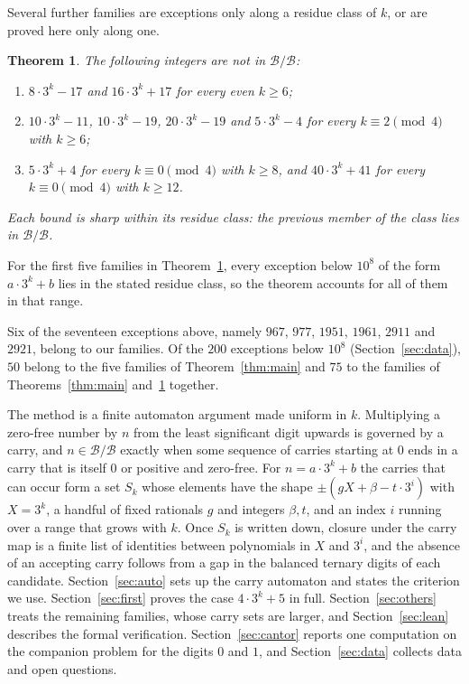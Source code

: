 \documentclass[11pt]{amsart}
\newtheorem{theorem}{Theorem}[section]
\theoremstyle{definition}
\newcommand{\B}{\mathcal{B}}
\begin{document}
Several further families are exceptions only along a residue class of $k$, or are proved here only
along one.

\begin{theorem}\label{thm:classes}
The following integers are not in $\B/\B$:
\begin{enumerate}
\item $8\cdot 3^k-17$ and $16\cdot 3^k+17$ for every even $k\ge 6$;
\item $10\cdot 3^k-11$, $10\cdot 3^k-19$, $20\cdot 3^k-19$ and $5\cdot 3^k-4$ for every
$k\equiv 2\pmod 4$ with $k\ge 6$;
\item $5\cdot 3^k+4$ for every $k\equiv 0\pmod 4$ with $k\ge 8$, and $40\cdot 3^k+41$ for every
$k\equiv 0\pmod 4$ with $k\ge 12$.
\end{enumerate}
Each bound is sharp within its residue class: the previous member of the class lies in $\B/\B$.
\end{theorem}

For the first five families in Theorem~\ref{thm:classes}, every exception below $10^8$ of the form
$a\cdot 3^k+b$ lies in the stated residue class, so the theorem accounts for all of them in that range.

Six of the seventeen exceptions above, namely $967$, $977$, $1951$, $1961$, $2911$ and $2921$,
belong to our families. Of the $200$ exceptions below $10^8$ (Section~\ref{sec:data}), $50$ belong to
the five families of Theorem~\ref{thm:main} and $75$ to the families of Theorems~\ref{thm:main}
and~\ref{thm:classes} together.

The method is a finite automaton argument made uniform in $k$. Multiplying a zero-free number by $n$
from the least significant digit upwards is governed by a carry, and $n\in\B/\B$ exactly when some
sequence of carries starting at $0$ ends in a carry that is itself $0$ or positive and zero-free.
For $n=a\cdot 3^k+b$ the carries that can occur form a set $S_k$ whose elements have the shape
$\pm(gX+\beta-t\cdot 3^i)$ with $X=3^k$, a handful of fixed rationals $g$ and integers $\beta,t$, and
an index $i$ running over a range that grows with $k$. Once $S_k$ is written down, closure under the
carry map is a finite list of identities between polynomials in $X$ and $3^i$, and the absence of an
accepting carry follows from a gap in the balanced ternary digits of each candidate.
Section~\ref{sec:auto} sets up the carry automaton and states the criterion we use.
Section~\ref{sec:first} proves the case $4\cdot 3^k+5$ in full. Section~\ref{sec:others} treats the
remaining families, whose carry sets are larger, and Section~\ref{sec:lean} describes the formal
verification. Section~\ref{sec:cantor} reports one computation on the companion problem for the digits
$0$ and $1$, and Section~\ref{sec:data} collects data and open questions.
\end{document}
